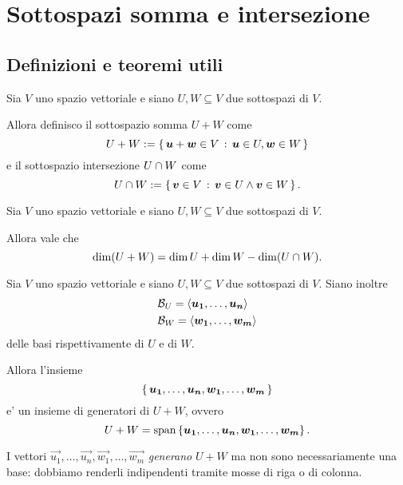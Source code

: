 \chapter{Sottospazi somma e intersezione}

\section{Definizioni e teoremi utili}

\begin{definition}
    Sia $V$ uno spazio vettoriale e siano $U, W \subseteq V$ due sottospazi di $V$. 
    
    Allora definisco il sottospazio somma $U + W$ come \[
        U + W := \left\{\,\bm{u} + \bm{w} \in V \,:\, \bm{u} \in U, \bm{w} \in W\,\right\}    
    \] e il sottospazio intersezione $U \cap W$ come \[
        U \cap W := \left\{\,\bm{v} \in V \,:\, \bm{v} \in U \land \bm{v} \in W\,\right\}.
    \]
\end{definition}

\begin{theorem}
     \label{th:grassman}
    Sia $V$ uno spazio vettoriale e siano $U, W \subseteq V$ due sottospazi di $V$. 
    
    Allora vale che \[
        \dim(U + W) = \dim U + \dim W - \dim(U \cap W).    
    \]
\end{theorem}

\begin{proposition}\label{generatori_somma}
    Sia $V$ uno spazio vettoriale e siano $U, W \subseteq V$ due sottospazi di $V$. Siano inoltre \begin{align*}
        &\mathcal{B}_U = \left\langle \bm{u_1}, \dots, \bm{u_n} \right\rangle\\
        &\mathcal{B}_W = \left\langle \bm{w_1}, \dots, \bm{w_m} \right\rangle
    \end{align*} delle basi rispettivamente di $U$ e di $W$. 
        
    Allora l'insieme \[
        \left\{\,\bm{u_1}, \dots, \bm{u_n}, \bm{w_1}, \dots, \bm{w_m}\,\right\}
    \] e' un insieme di generatori di $U+W$, ovvero \begin{equation}
        U + W = \operatorname{span}\left\{\bm{u_1}, \dots, \bm{u_n}, \bm{w_1}, \dots, \bm{w_m}\right\}.
    \end{equation}
\end{proposition}

\begin{remark}
    I vettori $\vec{u_1}, \dots, \vec{u_n}, \vec{w_1}, \dots, \vec{w_m}$ \emph{generano} $U+W$ ma non sono necessariamente una base: dobbiamo renderli indipendenti tramite mosse di riga o di colonna.
\end{remark}

